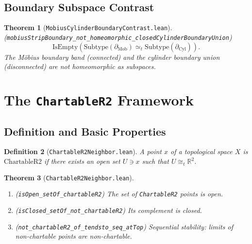 \documentclass[11pt]{article}
\newtheorem{theorem}{Theorem}[section]
\newtheorem{definition}[theorem]{Definition}
\newcommand{\leanref}[1]{\texttt{\small #1}}
\begin{document}

\subsection{Boundary Subspace Contrast}

\begin{theorem}[\leanref{MobiusCylinderBoundaryContrast.lean}]
\label{thm:boundary-contrast}
(\leanref{mobiusStripBoundary\_not\_homeomorphic\_closedCylinderBoundaryUnion})
\[
  \mathrm{IsEmpty}\!\left(\mathrm{Subtype}(\partial_{\mathrm{Mob}}) \simeq_t \mathrm{Subtype}(\partial_{\mathrm{Cyl}})\right).
\]
The M\"obius boundary band (connected) and the cylinder boundary union (disconnected) are not homeomorphic as subspaces.
\end{theorem}

\section{The \texttt{ChartableR2} Framework}
\label{sec:chartable}


\subsection{Definition and Basic Properties}

\begin{definition}[\leanref{ChartableR2Neighbor.lean}]
\label{def:chartable}
A point $x$ of a topological space $X$ is \emph{$\mathrm{ChartableR2}$} if there exists an open set $U \ni x$ such that $U \cong_t \mathbb{R}^2$.
\end{definition}

\begin{theorem}[\leanref{ChartableR2Neighbor.lean}]
\label{thm:chartable-props}
\leavevmode
\begin{enumerate}[label=(\alph*)]
\item (\leanref{isOpen\_setOf\_chartableR2}) The set of \texttt{ChartableR2} points is open.
\item (\leanref{isClosed\_setOf\_not\_chartableR2}) Its complement is closed.
\item (\leanref{not\_chartableR2\_of\_tendsto\_seq\_atTop}) Sequential stability: limits of non-chartable points are non-chartable.
\end{enumerate}
\end{theorem}
\end{document}
